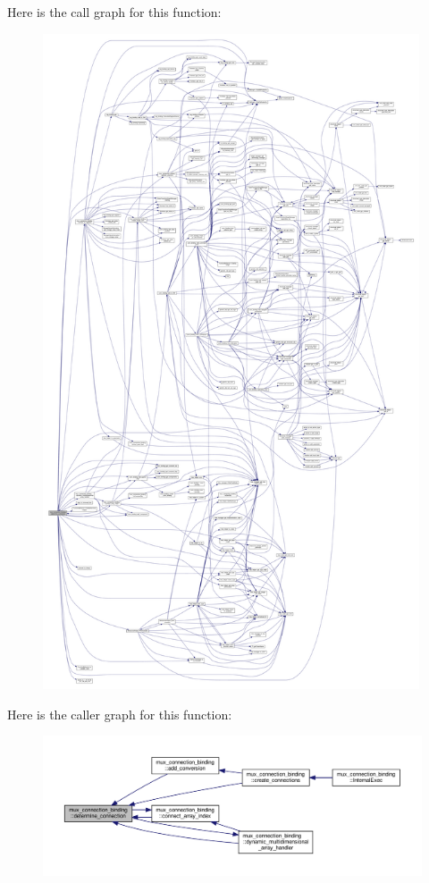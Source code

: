 Here is the call graph for this function\+:
\nopagebreak
\begin{figure}[H]
\begin{center}
\leavevmode
\includegraphics[height=550pt]{d7/d1e/classmux__connection__binding_ad6e5804e02d1a7c926ecdb1ae458a76f_cgraph}
\end{center}
\end{figure}
Here is the caller graph for this function\+:
\nopagebreak
\begin{figure}[H]
\begin{center}
\leavevmode
\includegraphics[width=350pt]{d7/d1e/classmux__connection__binding_ad6e5804e02d1a7c926ecdb1ae458a76f_icgraph}
\end{center}
\end{figure}

